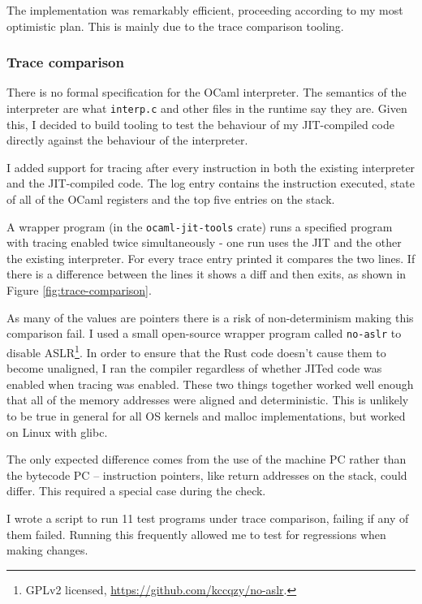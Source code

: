 The implementation was remarkably efficient, proceeding according to my most optimistic plan. This
is mainly due to the trace comparison tooling.

\subsubsection{Trace comparison} \label{trace-comparison}

There is no formal specification for the OCaml interpreter. The semantics of the interpreter are
what
\texttt{interp.c} and other files in the runtime say they are. Given this, I decided to build
tooling to test the behaviour of my JIT-compiled code directly against the behaviour of the
interpreter.

I added support for tracing after every instruction in both the existing interpreter and the
JIT-compiled code. The log entry contains the instruction executed, state of all of the OCaml
registers and the top five entries on the stack.

A wrapper program (in the \texttt{ocaml-jit-tools} crate) runs a specified program with tracing
enabled twice simultaneously - one run uses the JIT and the other the existing interpreter.  For
every trace entry printed it compares the two lines. If there is a difference between the lines it
shows a diff and then exits, as shown in Figure \ref{fig:trace-comparison}.

As many of the values are pointers there is a risk of non-determinism making this comparison fail.
I used a small open-source wrapper program called \texttt{no-aslr} to disable ASLR\footnote{GPLv2
      licensed, \url{https://github.com/kccqzy/no-aslr}.}. In order to ensure
that the Rust code doesn't cause them to become unaligned, I ran the compiler regardless of whether
JITed code was enabled when tracing was enabled. These two things together worked well enough that
all of the memory addresses were aligned and deterministic. This is unlikely to be true in general
for all OS kernels and malloc implementations, but worked on Linux with glibc.

The only expected difference comes from the use of the machine PC rather than the bytecode PC --
instruction pointers, like return addresses on the stack, could differ. This required a special
case during the check.

I wrote a script to run 11 test programs under trace comparison, failing if any of them failed.
Running this frequently allowed me to test for regressions when making changes.

